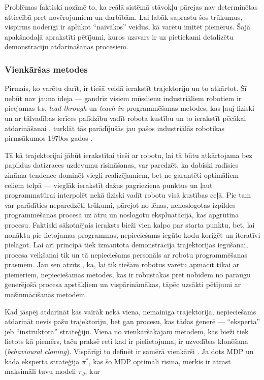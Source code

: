 \documentclass[12pt, a4paper]{article}
\numberwithin{equation}{section} %
\begin{document}
Problēmas faktiski nozīmē to, ka reālā sistēmā stāvokļu pārejas nav determinētas attiecībā pret novērojumiem un darbībām. Lai labāk saprastu šos trūkumus, vispirms noderīgi ir aplūkot ``naivākos'' veidus, kā varētu imitēt piemērus. Šajā apakšnodaļā aprakstīti pētījumi, kuros uzsvars ir uz pietiekami detalizētu demonstrāciju atdarināšanas procesiem.

\subsubsection{Vienkāršas metodes}

Pirmais, ko varētu darīt, ir tiešā veidā ierakstīt trajektoriju un to atkārtot. Šī nebūt nav jauna ideja --- gandrīz visiem mūsdienu industriāliem robotiem ir pieejamas t.s. \textit{lead-through} un \textit{teach-in} programmēšanas metodes, kas ļauj fiziski un ar tālvadības ierīces palīdzību vadīt robota kustību un to ierakstīt pēcākai atdarināšanai \cite{teach_pendant}, turklāt tās parādījušās jau pašos industriālās robotikas pirmsākumos 1970os gados \cite{abb2016special}.

Tā kā trajektorijai jābūt ierakstītai tieši ar robotu, lai tā būtu atkārtojama bez papildus datizraces uzdevumu risināšanas, var paredzēt, ka dabiski radīsies zināma tendence dominēt viegli realizējamiem, bet ne garantēti optimāliem ceļiem telpā --- vieglāk ierakstīt dažus pagrieziena punktus un ļaut programmatūrai interpolēt nekā fiziski vadīt robotu visā kustības ceļā. Pie tam var parādīties neparedzēti trūkumi, pārejot no lēnas, nenoslogotas izpildes programmēšanas procesā uz ātru un noslogotu ekspluatācijā, kas apgrūtina procesu. Faktiski sākotnējais ieraksts bieži vien kalpo par starta punktu, bet, lai nonāktu pie lietojamas programmas, nepieciešams iegūto kodu koriģēt un iteratīvi pielāgot. Lai arī principā tiek izmantota demonstrācija trajektorijas iegūšanai, procesa veikšanai tik un tā nepieciešams personāls ar robotu programmēšanas prasmēm. Jau sen atzīts \cite{muench1994robot,billard2008handbook}, ka, lai tik tiešām robotus varētu apmācīt tikai ar piemēriem, nepieciešamas metodes, kas ir robustākas pret nobīdēm no paraugu ģenerējošā procesa apstākļiem un vispārināmākas, tāpēc uzsākti pētījumi ar mašīnmācīšanās metodēm.

Kad jāspēj atdarināt kas vairāk nekā viena, nemainīga trajektorija, nepieciešams atdarināt nevis pašu trajektoriju, bet gan procesu, kas tādas ģenerē --- ``eksperta'' jeb ``instruktora'' stratēģiju. Viena no vienkāršākajām metodēm, kas bieži tiek lietots kā piemērs, taču praksē reti kad ir pielietojuma, ir uzvedības klonēšana (\textit{behavioural cloning}). Vispārīgi to definēt ir samērā vienkārši \cite{attia2018global}. Ja dots MDP un kāda eksperta stratēģija $\pi^*$, kas šo MDP optimāli risina, mērķis ir atrast maksimāli tuvu modeli $\pi_{\theta}$, kur
\end{document}
